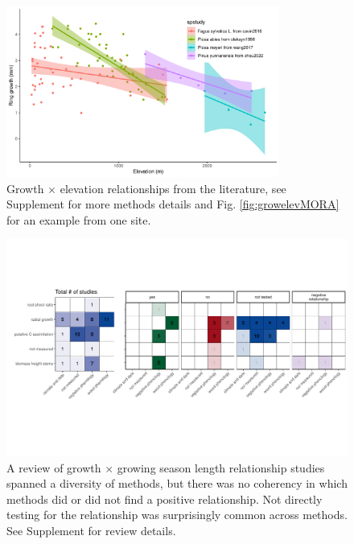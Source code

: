 \documentclass[11pt]{article}
\begin{document}
\begin{figure}[h!]
\includegraphics[width=0.8\textwidth]{..//analyses/growthxelevationetc/figures/growthxelev4studies.pdf}
\caption{Growth $\times$ elevation relationships from the literature, see Supplement for more methods details and Fig. \ref{fig:growelevMORA} for an example from one site.}
\label{fig:gxelev}
\end{figure}

\clearpage
\begin{figure}[h!]
\includegraphics[width=1\textwidth]{..//figures/heatmaps/combinedheatmap_gslxgrowth_simple.pdf}
\caption{A review of growth $\times$ growing season length relationship studies spanned a diversity of methods, but there was no coherency in which methods did or did not find a positive relationship. Not directly testing for the relationship was surprisingly common across methods. See Supplement for review details.}
\label{fig:heatmaps}
\end{figure}
\end{document}
